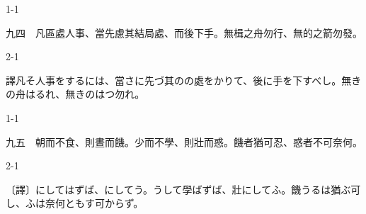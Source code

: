 \documentclass[tate,paper=b6j,jafontsize=9pt]{jlreq}
\begin{document}
\begin{azconvIndented}{1\zw}{-1\zw}

九四　凡區處人事、當先慮其結局處、而後下\azconvKunten{\azconvJR}手。無楫之舟勿行、無的之箭勿發。

\end{azconvIndented}
\begin{azconvIndented}{2\zw}{-1\zw}

譯凡そ人事をするには、當さに先づ其のの處をかりて、後に手を下すべし。無きの舟はるれ、無きのはつ勿れ。

\end{azconvIndented}

\begin{azconvIndented}{1\zw}{-1\zw}

九五　朝而不食、則晝而饑。少而不學、則壯而惑。饑者猶可忍、惑者不可奈何。

\end{azconvIndented}
\begin{azconvIndented}{2\zw}{-1\zw}


〔譯〕にしてはずば、にしてう。うして學ばずば、壯にしてふ。饑うるは猶ぶ可し、ふは奈何ともす可からず。

\end{azconvIndented}
\end{document}
